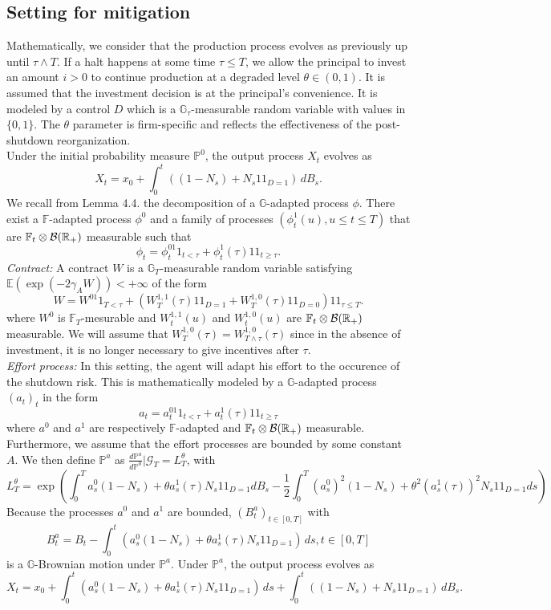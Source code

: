\documentclass[numbook, envcountsect, envcountsame, envcountreset, runningheads, smallextended]{article}
\def \E{\mathbb{E}}
\def \P{\mathbb{P}}
\def \R{\mathbb{R}}
\def \ind{1\!\!1}
\begin{document}
\subsection{Setting for mitigation}
Mathematically, we consider that the production process evolves as previously up until $\tau \wedge T$. If a halt happens at some time $\tau \leq T$, we allow the principal to invest an amount $i>0$ to continue production at a degraded level $\theta \in (0,1)$. It is assumed that the investment decision is at the principal's convenience. It is modeled by a control $D$ which is a ${\mathbb G}_\tau$-measurable random variable with values in $\{0,1\}$. The $\theta$ parameter is firm-specific and  reflects the effectiveness of the post-shutdown reorganization.\\
Under the initial probability measure $\mathbb{P}^0$, the output process $X_t$ evolves as
$$
X_t=x_0+\int_0^t ((1-N_s)+N_s\ind_{D=1})\,dB_s.
$$
We recall from \cite{Jeulin:1980} Lemma 4.4. the decomposition of a $\mathbb G$-adapted process $\phi$. There exist a $\mathbb F$-adapted process $\phi^0$ and a family of processes $(\phi^1_t (u), u \le t \le T)$ that are $\mathbb F_t \otimes {\cal B}(\R_+)$ measurable such that
$$
\phi_t=\phi_t^0\ind_{t<\tau}+\phi^1_t(\tau)\ind_{t \ge \tau}.
$$ 
{\it Contract:}  A contract $W$ is a $\mathbb{G}_{T}$-measurable random variable satisfying $\E(\exp(-2\gamma_A W))<+\infty$ of the form
$$
W=W^0\ind_{T<\tau}+(W_T^{1,1}(\tau)\ind_{D=1}+W^{1,0}_T(\tau)\ind_{D=0})\ind_{\tau \le T}.
$$
where $W^0$ is $\mathbb F_T$-mesurable and $W_t^{1,1}(u)$ and $W_t^{1,0}(u)$ are $\mathbb F_t \otimes {\cal B}(\R_+)$ measurable. We will assume that $W_T^{1,0}(\tau)=W_{T\wedge \tau}^{1,0}(\tau)$ since in the absence of investment, it is no longer necessary to give incentives after $\tau$.\\

{\it Effort process:} In this setting, the agent will adapt his effort to the occurence of the shutdown risk. This is mathematically modeled by a $\mathbb G$-adapted process $(a_t)_t$ in the form
$$
a_t=a_t^0\ind_{t<\tau}+a^1_t(\tau)\ind_{t \ge \tau}
$$ 
where $a^0$ and $a^1$ are respectively $\mathbb F$-adapted and $\mathbb F_t \otimes {\cal B}(\R_+)$ measurable. Furthermore, we assume that the effort processes are  bounded by some constant $A$.
We then define $\P^a$ as $ \frac{d\mathbb{P}^a}{d\mathbb{P}^0}|\mathcal{G}_T =L_T^\theta$, with
$$
L_T^\theta = \exp\left( \int_0^T a_s^0(1-N_s)+\theta a^1_s(\tau)N_s\ind_{D=1} dB_s - \frac{1}{2} \int_0^T (a_s^0)^2 (1-N_s)+\theta^2(a^1_s(\tau))^2N_s\ind_{D=1}ds \right)$$
 Because the processes $a^0$ and $a^1$ are bounded, $(B^a_t)_{t \in [0,T]}$ with
 $$
 B^a_t = B_t - \int_0^t (a_s^0(1-N_s)+\theta a^1_s(\tau)N_s\ind_{D=1})\, ds, t \in [0,T]
 $$ 
 is a $\mathbb{G}$-Brownian motion under $\mathbb{P}^a$. Under $\P^a$, the output process evolves as
 $$
 X_t=x_0+\int_0^t (a_s^0(1-N_s)+\theta a^1_s(\tau)N_s\ind_{D=1})\, ds+\int_0^t ((1-N_s)+N_s\ind_{D=1})\,dB_s.
 $$
\end{document}

